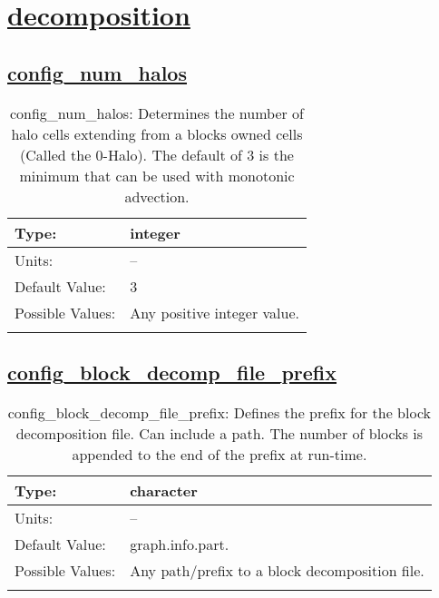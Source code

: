 \section[decomposition]{\hyperref[sec:nm_tab_decomposition]{decomposition}}
\label{sec:nm_sec_decomposition}
\subsection[config\_num\_halos]{\hyperref[sec:nm_tab_decomposition]{config\_num\_halos}}
\label{subsec:nm_sec_config_num_halos}
\begin{center}
\begin{longtable}{| p{2.0in} || p{4.0in} |}
    \hline
    Type: & integer \\
    \hline
    Units: & -- \\
    \hline
    Default Value: & 3 \\
    \hline
    Possible Values: & Any positive integer value. \\
    \hline
    \caption{config\_num\_halos: Determines the number of halo cells extending from a blocks owned cells (Called the 0-Halo). The default of 3 is the minimum that can be used with monotonic advection.}
\end{longtable}
\end{center}
\subsection[config\_block\_decomp\_file\_prefix]{\hyperref[sec:nm_tab_decomposition]{config\_block\_decomp\_file\_prefix}}
\label{subsec:nm_sec_config_block_decomp_file_prefix}
\begin{center}
\begin{longtable}{| p{2.0in} || p{4.0in} |}
    \hline
    Type: & character \\
    \hline
    Units: & -- \\
    \hline
    Default Value: & graph.info.part. \\
    \hline
    Possible Values: & Any path/prefix to a block decomposition file. \\
    \hline
    \caption{config\_block\_decomp\_file\_prefix: Defines the prefix for the block decomposition file. Can include a path. The number of blocks is appended to the end of the prefix at run-time.}
\end{longtable}
\end{center}
